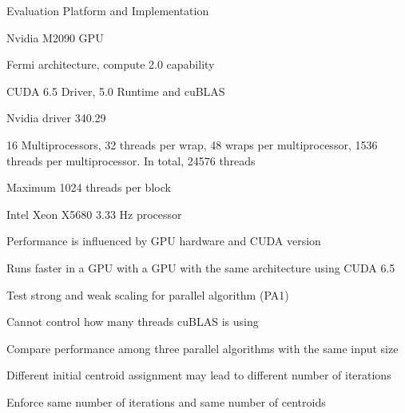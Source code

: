 \documentclass[
nopagebreaks,
style=klope,
fleqn]{powerdot}
\begin{document}
\begin{slide}{Evaluation Platform and Implementation}
  \small
  \begin{compactitem}
  \item{Nvidia M2090 GPU
    \begin{compactitem}
    \item{Fermi architecture, compute 2.0 capability}
    \item{CUDA 6.5 Driver, 5.0 Runtime and cuBLAS}
    \item{Nvidia driver 340.29}
    \item{16 Multiprocessors, 32 threads per wrap, 48 wraps per multiprocessor, 1536 threads per
      multiprocessor. In total, 24576 threads}
    \item{Maximum 1024 threads per block}
    \end{compactitem}
  }
  \item{Intel Xeon X5680 3.33 Hz processor}
  \item{Performance is influenced by GPU hardware and CUDA version
    \begin{compactitem}
    \item{Runs faster in a GPU with a GPU with the same architecture using CUDA 6.5}  
    \end{compactitem}
  }
\item{Test strong and weak scaling for parallel algorithm (PA1)}
  \item{Cannot control how many threads cuBLAS is using
    \begin{compactitem}
    \item{Compare performance among three parallel algorithms with the same input size}
    \end{compactitem}
  }
  \item{Different initial centroid assignment may lead to different number of iterations
    \begin{compactitem}
    \item{Enforce same number of iterations and same number of centroids}
    \end{compactitem}
  }
  \end{compactitem}
\end{slide}
\end{document}
